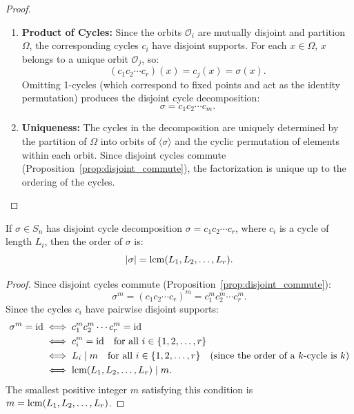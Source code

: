 \begin{proof}
\begin{enumerate}[label=\arabic*., leftmargin=*]
    \item \textbf{Product of Cycles:}
    Since the orbits $\mathcal{O}_i$ are mutually disjoint and partition $\Omega$, the corresponding cycles $c_i$ have disjoint supports.
    For each $x \in \Omega$, $x$ belongs to a unique orbit $\mathcal{O}_j$, so:
    \begin{equation*}
    (c_1 c_2 \cdots c_r)(x) = c_j(x) = \sigma(x).
    \end{equation*}
    Omitting 1-cycles (which correspond to fixed points and act as the identity permutation) produces the disjoint cycle decomposition:
    \begin{equation*}
    \sigma = c_1 c_2 \cdots c_m.
    \end{equation*}

    \item \textbf{Uniqueness:}
    The cycles in the decomposition are uniquely determined by the partition of $\Omega$ into orbits of $\langle \sigma \rangle$ and the cyclic permutation of elements within each orbit. Since disjoint cycles commute (Proposition~\ref{prop:disjoint_commute}), the factorization is unique up to the ordering of the cycles.
\end{enumerate}
\end{proof}

\begin{proposition}
\label{prop:perm_order}
If $\sigma \in S_n$ has disjoint cycle decomposition $\sigma = c_1 c_2 \cdots c_r$, where $c_i$ is a cycle of length $L_i$, then the order of $\sigma$ is:
\begin{equation}
|\sigma| = \operatorname{lcm}(L_1, L_2, \dots, L_r).
\end{equation}
\end{proposition}

\begin{proof}
Since disjoint cycles commute (Proposition~\ref{prop:disjoint_commute}):
\begin{equation*}
\sigma^m = (c_1 c_2 \cdots c_r)^m = c_1^m c_2^m \cdots c_r^m.
\end{equation*}
Since the cycles $c_i$ have pairwise disjoint supports:
\begin{align*}
\sigma^m = \text{id} 
&\iff c_1^m c_2^m \cdots c_r^m = \text{id} \\
&\iff c_i^m = \text{id} \quad \text{for all } i \in \{1, 2, \dots, r\} \\
&\iff L_i \mid m \quad \text{for all } i \in \{1, 2, \dots, r\} \quad \text{(since the order of a $k$-cycle is $k$)} \\
&\iff \operatorname{lcm}(L_1, L_2, \dots, L_r) \mid m.
\end{align*}
The smallest positive integer $m$ satisfying this condition is $m = \operatorname{lcm}(L_1, L_2, \dots, L_r)$.
\end{proof}

